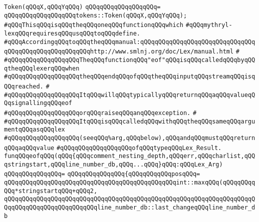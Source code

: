 \newline
\verb|Token(qQQqX,qQQqYqQQq)|\newline
\verb|qQQqqQQqqQQqqQQqqQQq=|\newline
\verb|qQQqqQQqqQQqqQQqqQQqtokens::Token(qQQqX,qQQqYqQQq);|\newline
\newline
\verb|#qQQqThisqQQqisqQQqtheqQQqoneqQQqfunctionqQQqwhich|\newline
\verb|#qQQqmythryl-lexqQQqrequiresqQQqusqQQqtoqQQqdefine.|\newline
\verb|#qQQqAccordingqQQqtoqQQqtheqQQqmanual:qQQqqQQqqQQqqQQqqQQqqQQqqQQqqQQqqQQqqQQqqQQqqQQqqQQqqQQqhttp://www.smlnj.org/doc/Lex/manual.html|\newline
\verb|#|\newline
\verb|#qQQqqQQqqQQqqQQqqQQqTheqQQqfunctionqQQq"eof"qQQqisqQQqcalledqQQqbyqQQqtheqQQqlexerqQQqwhen|\newline
\verb|#qQQqqQQqqQQqqQQqqQQqtheqQQqendqQQqofqQQqtheqQQqinputqQQqstreamqQQqisqQQqreached.|\newline
\verb|#|\newline
\verb|#qQQqqQQqqQQqqQQqqQQqItqQQqwillqQQqtypicallyqQQqreturnqQQqaqQQqvalueqQQqsignallingqQQqeof|\newline
\verb|#qQQqqQQqqQQqqQQqqQQqorqQQqraiseqQQqanqQQqexception.|\newline
\verb|#|\newline
\verb|#qQQqqQQqqQQqqQQqqQQqItqQQqisqQQqcalledqQQqwithqQQqtheqQQqsameqQQqargumentqQQqasqQQqlex|\newline
\verb|#qQQqqQQqqQQqqQQqqQQq(seeqQQq%arg,qQQqbelow),qQQqandqQQqmustqQQqreturnqQQqaqQQqvalue|\newline
\verb|#qQQqqQQqqQQqqQQqqQQqofqQQqtypeqQQqLex_Result.|\newline
\newline
\verb|funqQQqeofqQQq(qQQq{qQQqcomment_nesting_depth,qQQqerr,qQQqcharlist,qQQqstringstart,qQQqline_number_db,qQQq...qQQq}qQQq:qQQqLex_Arg)|\newline
\verb|qQQqqQQqqQQqqQQq=|\newline
\verb|qQQqqQQqqQQqqQQq{qQQqqQQqqQQqposqQQq=|\newline
\verb|qQQqqQQqqQQqqQQqqQQqqQQqqQQqqQQqqQQqqQQqqQQqqQQqint::maxqQQq(qQQqqQQqqQQq*stringstartqQQq+qQQq2,|\newline
\verb|qQQqqQQqqQQqqQQqqQQqqQQqqQQqqQQqqQQqqQQqqQQqqQQqqQQqqQQqqQQqqQQqqQQqqQQqqQQqqQQqqQQqqQQqqQQqqQQqline_number_db::last_changeqQQqline_number_db|\newline
